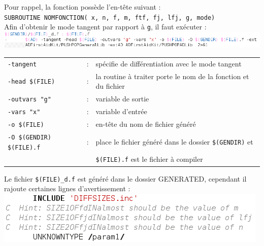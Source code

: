 Pour rappel, la fonction poss\`ede l'en-tête suivant : \\
     {\tt SUBROUTINE  NOMFONCTION( x, n, f, m, ftf, fj, lfj, g, mode)} \\

Afin d'obtenir le mode tangent par rapport à {\tt g}, il faut exécuter : \\

\includegraphics[scale=0.7]{code/tangent.png}

\begin{tabular}{lll}
\verb!-tangent!&:& spécifie de différentiation avec le mode tangent \\
\verb!-head $(FILE)!&:& la routine à traiter porte le nom de la fonction et du fichier \\
\verb!-outvars "g"!&:& variable de sortie \\
\verb!-vars "x"!&:& variable d'entrée \\
\verb!-o $(FILE)!&:& en-tête du nom de fichier généré \\
\verb!-O $(GENDIR) $(FILE).f!&:& place le fichier généré dans le dossier \verb!$(GENDIR)! et\\
 && \verb!$(FILE).f! est le fichier à compiler \\
\end{tabular}


Le fichier \verb!$(FILE)_d.f! est généré dans le dossier GENERATED, cependant il rajoute certaines lignes d'avertissement : \\


\includegraphics[scale=0.7]{code/tangentajout.png}


